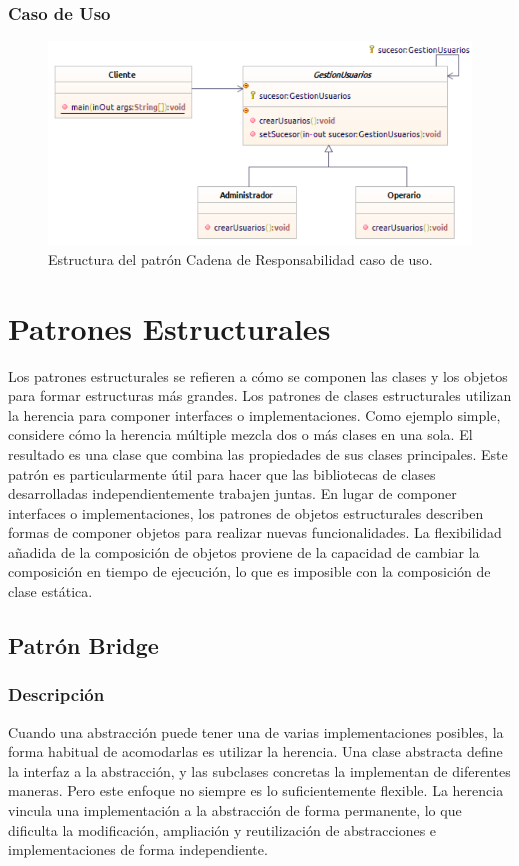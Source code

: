 \subsubsection{Caso de Uso}
\begin{figure}[th!]
	\centering
	\includegraphics[width=.7\linewidth]{imagenes/Patrones/Cadena_caso.pdf}
	\caption{Estructura del patrón Cadena de Responsabilidad caso de uso.\cite{gof}}	
\end{figure}

\section{Patrones Estructurales}
Los patrones estructurales se refieren a cómo se componen las clases y los objetos para formar estructuras más grandes. Los patrones de clases estructurales utilizan la herencia para componer interfaces o implementaciones. Como ejemplo simple, considere cómo la herencia múltiple mezcla dos o más clases en una sola. El resultado es una clase que combina las propiedades de sus clases principales. Este patrón es particularmente útil para hacer que las bibliotecas de clases desarrolladas independientemente trabajen juntas. En lugar de componer interfaces o implementaciones, los patrones de objetos estructurales describen formas de componer objetos para realizar nuevas funcionalidades. La flexibilidad añadida de la composición de objetos proviene de la capacidad de cambiar la composición en tiempo de ejecución, lo que es imposible con la composición de clase estática.\cite{gof}
\subsection{Patrón Bridge}


\subsubsection{Descripción}
Cuando una abstracción puede tener una de varias implementaciones posibles, la forma habitual de acomodarlas es utilizar la herencia. Una clase abstracta define la interfaz a la abstracción, y las subclases concretas la implementan de diferentes maneras. Pero este enfoque no siempre es lo suficientemente flexible. La herencia vincula una implementación a la abstracción de forma permanente, lo que dificulta la modificación, ampliación y reutilización de abstracciones e implementaciones de forma independiente.

